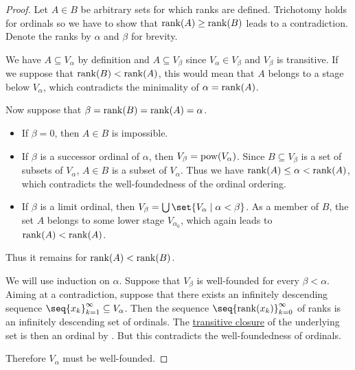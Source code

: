 \begin{proof}
   Let \( A \in B \) be arbitrary sets for which ranks are defined. Trichotomy holds for ordinals so we have to show that \( \operatorname{rank}(A) \geq \operatorname{rank}(B) \) leads to a contradiction. Denote the ranks by \( \alpha \) and \( \beta \) for brevity.

  We have \( A \subseteq V_\alpha \) by definition and \( A \subseteq V_\beta \) since \( V_\alpha \in V_\beta \) and \( V_\beta \) is transitive. If we suppose that \( \operatorname{rank}(B) < \operatorname{rank}(A) \), this would mean that \( A \) belongs to a stage below \( V_\alpha \), which contradicts the minimality of \( \alpha = \operatorname{rank}(A) \).

  Now suppose that \( \beta = \operatorname{rank}(B) = \operatorname{rank}(A) = \alpha \).
  \begin{itemize}
    \item If \( \beta = 0 \), then \( A \in B \) is impossible.

    \item If \( \beta \) is a successor ordinal of \( \alpha \), then \( V_\beta = \operatorname{pow}(V_\alpha) \). Since \( B \subseteq V_\beta \) is a set of subsets of \( V_\alpha \), \( A \in B \) is a subset of \( V_\alpha \). Thus we have \( \operatorname{rank}(A) \leq \alpha < \operatorname{rank}(A) \), which contradicts the well-foundedness of the ordinal ordering.

    \item If \( \beta \) is a limit ordinal, then \( V_\beta = \bigcup\set{ V_\alpha \given \alpha < \beta } \). As a member of \( B \), the set \( A \) belongs to some lower stage \( V_{\alpha_0} \), which again leads to \( \operatorname{rank}(A) < \operatorname{rank}(A) \).
  \end{itemize}

  Thus it remains for \( \operatorname{rank}(A) < \operatorname{rank}(B) \).

   We will use induction on \( \alpha \). Suppose that \( V_\beta \) is well-founded for every \( \beta < \alpha \). Aiming at a contradiction, suppose that there exists an infinitely descending sequence \( \seq{ x_k }_{k=1}^\infty \subseteq V_\alpha \). Then the sequence \( \seq{ \rank(x_k) }_{k=0}^\infty \) of ranks is an infinitely descending set of ordinals. The \hyperref[def:transitive_closure_of_a_set]{transitive closure} of the underlying set is then an ordinal by . But this contradicts the well-foundedness of ordinals.

  Therefore \( V_\alpha \) must be well-founded.


\end{proof}
